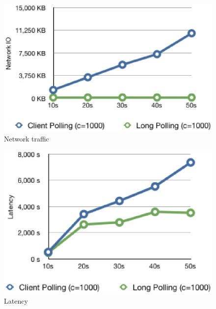 \begin{figure}[htb!]
\centering%
    \includegraphics[scale=0.60]{figures/io.eps}
    \caption{Network traffic}
    \label{fig:traffic_io}
\end{figure}

\begin{figure}[htb!]
\centering%
    \includegraphics[scale=0.60]{figures/latency.eps}
    \caption{Latency}
    \label{fig:traffic_latency}
\end{figure}

